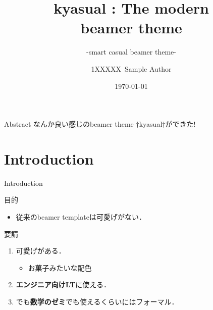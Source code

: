 \documentclass[aspectratio=1610,14pt]{beamer}
\title{%
    kyasual : The modern\\ beamer theme
}
\subtitle{
    -smart casual beamer theme-
}
\author{%
    1XXXXX\ Sample Author
}
\institute[Sample Univ.]{%
    Sample Univ. 
}
\date{%
    \today
}
\begin{document}
%
%
\begin{frame}
\maketitle 
\end{frame}

\begin{frame}[fragile]{Abstract}
    なんか良い感じのbeamer theme †\alert{kyasual}†ができた!
\end{frame}

\section{Introduction}

\begin{frame}
    \tableofcontents[currentsection]
\end{frame}

\begin{frame}{Introduction}
    \begin{textblock}{目的}
        \begin{itemize}
        \item{従来のbeamer templateは可愛げがない．}
        \end{itemize}
    \end{textblock}
    \begin{textblock}{要請}
        \begin{enumerate}
            \item{\alert{可愛げがある．}}
                \begin{itemize}
                    \item{お菓子みたいな配色}
                \end{itemize}
            \item{\textbf{エンジニア向けLT}に使える．}
            \item{でも\textbf{数学のゼミ}でも使えるくらいには\alert{フォーマル}．}
                \begin{itemize}
                \end{itemize}
        \end{enumerate}
    \end{textblock}
\end{frame}
\end{document}
